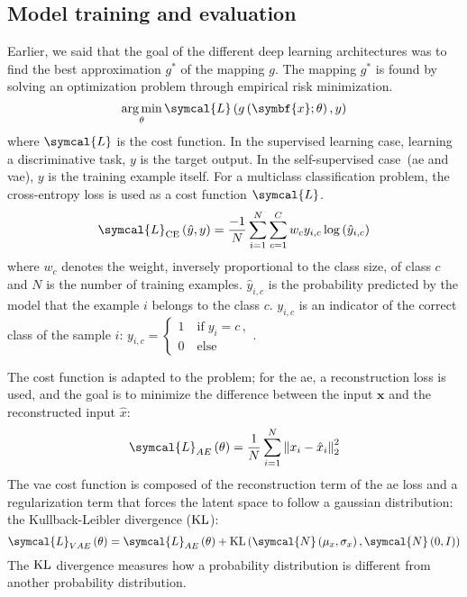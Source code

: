 \documentclass[../main.tex]{subfiles}
\begin{document}
	\subsection{Model training and evaluation}
		Earlier, we said that the goal of the different deep learning architectures was to find the best approximation \(g^{*}\) of the mapping \(g\).
		The mapping \(g^{*}\) is found by solving an optimization problem through empirical risk minimization.
		\begin{equation}
			\argmin_{\theta} \symcal{L}\left(g\left(\symbf{x}; \theta\right), y\right) \label{eq:dl_opt}
		\end{equation}
		where \(\symcal{L}\) is the cost function.
		In the supervised learning case, learning a discriminative task, \(y\) is the target output.
		In the self-supervised case~(\gls{ae} and \gls{vae}), \(y\) is the training example itself.
		For a multiclass classification problem, the cross-entropy loss is used as a cost function \(\symcal{L}\).
		\begin{equation}
			\symcal{L}_{\text{CE}}\left(\hat{y}, y\right) = \frac{-1}{N}\sum_{i=1}^{N}\sum_{c=1}^{C} w_c y_{i,c}\log\left(\hat{y}_{i,c}\right)\label{eq:ce_loss}
		\end{equation}
		where \(w_c\) denotes the weight, inversely proportional to the class size, of class \(c\) and \(N\) is the number of training examples.
		\(\hat{y}_{i,c}\) is the probability predicted by the model that the example \(i\) belongs to the class \(c\).
		\(y_{i,c}\) is an indicator of the correct class of the sample \(i\):
		\(
		y_{i,c} = \begin{cases}
			1 \quad \text{if}\; y_i = c \, , \\
			0 \quad \text{else}
		\end{cases}
		\).

		The cost function is adapted to the problem; for the \gls{ae}, a reconstruction loss is used, and the goal is to minimize the difference between the input \(\symbf{x}\) and the reconstructed input \(\hat{x}\):
		\begin{equation}
			\symcal{L}_{AE}\left(\theta\right) = \frac{1}{N}\sum_{i=1}^{N} {\left\|x_i - \hat{x}_i \right\|}_2^{2} \label{eq:loss_ae}
		\end{equation}
		The \gls{vae} cost function is composed of the reconstruction term of the \gls{ae} loss and a regularization term that forces the latent space to follow a gaussian distribution: the Kullback-Leibler divergence (\(\operatorname{KL}\)):
		\begin{equation}
			\symcal{L}_{VAE}\left(\theta\right) = \symcal{L}_{AE}\left(\theta\right) + \KL\left(\symcal{N}\left(\mu_{x}, \sigma_{x}\right), \symcal{N}\left(0, I\right)\right)
		\end{equation}
		The \(\operatorname{KL}\) divergence measures how a probability distribution is different from another probability distribution.
\end{document}
